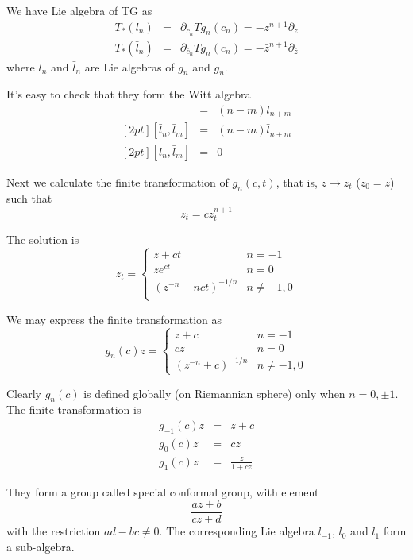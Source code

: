 \documentclass[12pt]{book}
\begin{document}
	We have Lie algebra of TG as
	\begin{eqnarray}
		T_*(l_n)&=&\partial_{c_n}Tg_n(c_n)=-z^{n+1}\partial_z\\
		T_*(\bar l_n)&=&\partial_{\bar c_n}Tg_n(c_n)=-\bar z^{n+1}\partial_{\bar z}
	\end{eqnarray}
	where $l_n$ and $\bar l_n$ are Lie algebras of $g_n$ and $\bar g_n$.
	
	It's easy to check that they form the Witt algebra
	\begin{eqnarray}
		[l_n,l_m]&=&(n-m)l_{n+m}\\
		[2pt][\bar l_n,\bar l_m]&=&(n-m)\bar l_{n+m}\\
		[2pt][l_n,\bar l_m]&=&0
	\end{eqnarray} 
	
	Next we calculate the finite transformation of $g_n(c,t)$, that is, $z\rightarrow z_t$ ($z_0=z$) such that 
	\begin{equation}
		\dot z_t=cz_t^{n+1}
	\end{equation}
	
	The solution is
	\begin{equation}
		z_t=\left\{ \begin{array}{ll}
			z+ct& n=-1\\
			ze^{ct}& n=0\\
			(z^{-n}-nct)^{-1/n}&n\neq -1,0\\
		\end{array} \right.
	\end{equation}
	
	We may express the finite transformation as
	\begin{equation}
		g_n(c)z=\left\{ \begin{array}{ll}
			z +c&n=-1\\
			cz&n=0\\
			(z^{-n}+c)^{-1/n}&n\neq -1,0
		\end{array} \right.
	\end{equation}
	
	Clearly $g_n(c)$ is defined globally (on Riemannian sphere) only when $n=0,\pm 1$. The finite transformation is
	\begin{eqnarray}
		g_{-1}(c)z&=&z+c\\
		g_0(c)z&=&cz\\
		g_1(c)z&=&\frac z{1+cz}
	\end{eqnarray}
	
	They form a group called special conformal group, with element
	\begin{equation}
		\frac{az+b}{cz+d}
	\end{equation}
	with the restriction $ad-bc\neq0$. The corresponding Lie algebra $l_{-1}$, $l_0$ and $l_1$ form a sub-algebra.
	
\end{document}
